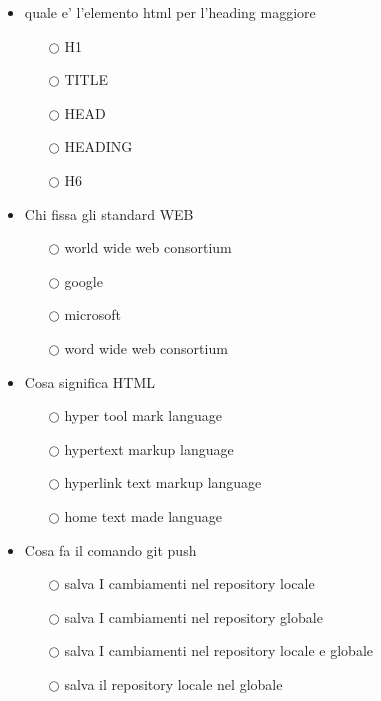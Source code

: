 \documentclass[10pt,twocolumn]{article}
\begin{document}
\begin{itemize}
    \item quale e' l'elemento html per l'heading maggiore
          \begin{itemize}
              \item[$\bigcirc$] H1
              \item[$\bigcirc$] TITLE
              \item[$\bigcirc$] HEAD
              \item[$\bigcirc$] HEADING
              \item[$\bigcirc$] H6
          \end{itemize}
\end{itemize}
\begin{itemize}
    \item Chi fissa gli standard WEB
          \begin{itemize}
              \item[$\bigcirc$] world wide web consortium
              \item[$\bigcirc$] google
              \item[$\bigcirc$] microsoft
              \item[$\bigcirc$] word wide web consortium
          \end{itemize}
\end{itemize}
\begin{itemize}
    \item Cosa significa HTML
          \begin{itemize}
              \item[$\bigcirc$] hyper tool mark language
              \item[$\bigcirc$] hypertext markup language
              \item[$\bigcirc$] hyperlink text markup language
              \item[$\bigcirc$] home text made language
          \end{itemize}
\end{itemize}
\begin{itemize}
    \item Cosa fa il comando git push
          \begin{itemize}
              \item[$\bigcirc$] salva I cambiamenti nel repository locale
              \item[$\bigcirc$] salva I cambiamenti nel repository globale
              \item[$\bigcirc$] salva I cambiamenti nel repository locale e globale
              \item[$\bigcirc$] salva il repository locale nel globale
          \end{itemize}
\end{itemize}
\end{document}
